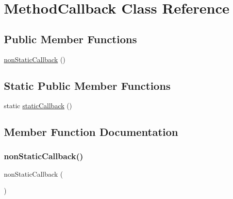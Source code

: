 \hypertarget{class_method_callback}{}\section{Method\+Callback Class Reference}
\label{class_method_callback}
\subsection*{Public Member Functions}
\begin{DoxyCompactItemize}
\item 
\mbox{\hyperlink{class_method_callback_a4af0c3bb716a1551583a840fcf227d71}{non\+Static\+Callback}} ()
\end{DoxyCompactItemize}
\subsection*{Static Public Member Functions}
\begin{DoxyCompactItemize}
\item 
static \mbox{\hyperlink{class_method_callback_a64284542b6fb1f42829f7287b7539f54}{static\+Callback}} ()
\end{DoxyCompactItemize}


\subsection{Member Function Documentation}
\mbox{\label{class_method_callback_a4af0c3bb716a1551583a840fcf227d71}} 
\subsubsection{\texorpdfstring{non\+Static\+Callback()}{nonStaticCallback()}}
{\footnotesize\ttfamily non\+Static\+Callback (\begin{DoxyParamCaption}{ }\end{DoxyParamCaption})}

\mbox{\label{class_method_callback_a64284542b6fb1f42829f7287b7539f54}} 
